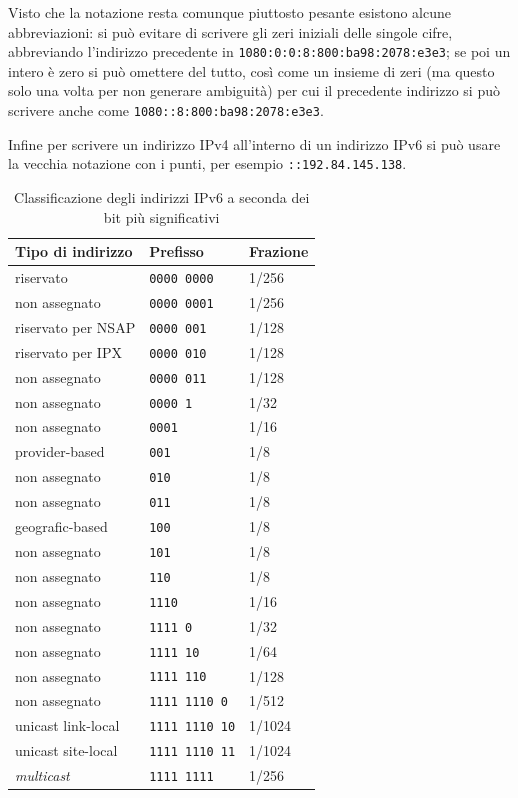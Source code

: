 Visto che la notazione resta comunque piuttosto pesante esistono alcune
abbreviazioni: si può evitare di scrivere gli zeri iniziali delle singole
cifre, abbreviando l'indirizzo precedente in
\texttt{1080:0:0:8:800:ba98:2078:e3e3}; se poi un intero è zero si può
omettere del tutto, così come un insieme di zeri (ma questo solo una volta per
non generare ambiguità) per cui il precedente indirizzo si può scrivere anche
come \texttt{1080::8:800:ba98:2078:e3e3}.

Infine per scrivere un indirizzo IPv4 all'interno di un indirizzo IPv6 si
può usare la vecchia notazione con i punti, per esempio
\texttt{::192.84.145.138}.

\begin{table}[htb]
  \centering 
  \footnotesize
  \begin{tabular}{|l|l|l|}
    \hline
    \centering \textbf{Tipo di indirizzo}
    & \centering \textbf{Prefisso} & {\centering \textbf{Frazione}} \\
    \hline
    \hline
    riservato & \texttt{0000 0000} & 1/256 \\
    non assegnato  & \texttt{0000 0001} & 1/256 \\
    \hline
    riservato per NSAP & \texttt{0000 001} & 1/128\\
    riservato per IPX & \texttt{0000 010} & 1/128\\
    \hline
    non assegnato  & \texttt{0000 011} & 1/128 \\
    non assegnato  & \texttt{0000 1} & 1/32 \\
    non assegnato  & \texttt{0001} & 1/16 \\
    \hline
    provider-based & \texttt{001} & 1/8\\
    \hline
    non assegnato  & \texttt{010} & 1/8 \\
    non assegnato  & \texttt{011} & 1/8 \\
    geografic-based& \texttt{100} & 1/8 \\
    non assegnato  & \texttt{101} & 1/8 \\
    non assegnato  & \texttt{110} & 1/8 \\
    non assegnato  & \texttt{1110} & 1/16 \\
    non assegnato  & \texttt{1111 0} & 1/32 \\
    non assegnato  & \texttt{1111 10} & 1/64 \\
    non assegnato  & \texttt{1111 110} & 1/128 \\
    non assegnato  & \texttt{1111 1110 0} & 1/512 \\
    \hline
    unicast link-local & \texttt{1111 1110 10} & 1/1024 \\
    unicast site-local & \texttt{1111 1110 11} & 1/1024 \\
    \hline
    \hline
    \textit{multicast} & \texttt{1111 1111} & 1/256 \\
    \hline
  \end{tabular}
  \caption{Classificazione degli indirizzi IPv6 a seconda dei bit più 
    significativi}
  \label{tab:IP_ipv6addr}
\end{table}


